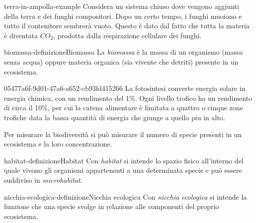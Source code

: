 \documentclass[preview]{standalone}
\begin{document}

\begin{snippetexample}{terra-in-ampolla-example}{}
    Considera un sistema chiuso dove vengono aggiunti della terra e dei funghi compositori.
    Dopo un certo tempo, i funghi muoiono e tutto il contenitore sembrerà vuoto.
    Questo è dato dal fatto che tutta la materia è diventata \(CO_2\),
    prodotta dalla respirazione cellulare dei funghi.
\end{snippetexample}


\begin{snippetdefinition}{biomassa-definizione}{Biomassa}
    La \textit{biomassa} è la massa di un organismo (massa senza acqua)
    oppure materia organica (sia vivente che detriti) presente in un ecosistema.
\end{snippetdefinition}

\begin{snippet}{05477a6f-9d01-47a6-a652-cb93fd415266}
    La fotosintesi converte energia solare in energia chimica, con un rendimento del 1\%.
    Ogni livello trofico ha un rendimento di circa il 10\%, per cui la catena alimentare
    è limitata a quattro o cinque zone trofiche data la bassa quantità di energia
    che giunge a quello piu in alto.

    Per misurare la biodiversità si può misurare il numero di specie presenti in un ecosistema
    e la loro concentrazione.
\end{snippet}

\begin{snippetdefinition}{habitat-definizione}{Habitat}
    Con \textit{habitat} si intende lo spazio fisico all'interno del quale vivono gli organismi
    appartenenti a una determinata specie e può essere suddiviso in \textit{microhabitat}.
\end{snippetdefinition}

\begin{snippetdefinition}{nicchia-ecologica-definizione}{Nicchia ecologica}
    Con \textit{nicchia ecologica} si intende la funzione che una specie svolge
    in relazione alle componenti del proprio ecosistema.
\end{snippetdefinition}

\end{document}
